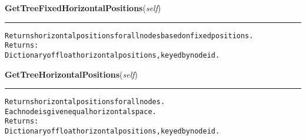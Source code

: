 \hspace{.8\funcindent}\begin{boxedminipage}{\funcwidth}

    \raggedright \textbf{GetTreeFixedHorizontalPositions}(\textit{self})

    \vspace{-1.5ex}

    \rule{\textwidth}{0.5\fboxrule}
\setlength{\parskip}{2ex}
\begin{alltt}

Returns horizontal positions for all nodes based on fixed positions.
Returns:
  Dictionary of float horizontal positions, keyed by node id.
\end{alltt}

\setlength{\parskip}{1ex}
    \end{boxedminipage}

    \label{coinor:grumpy:BB:BBTree:GetTreeHorizontalPositions}

    \vspace{0.5ex}

\hspace{.8\funcindent}\begin{boxedminipage}{\funcwidth}

    \raggedright \textbf{GetTreeHorizontalPositions}(\textit{self})

    \vspace{-1.5ex}

    \rule{\textwidth}{0.5\fboxrule}
\setlength{\parskip}{2ex}
\begin{alltt}

Returns horizontal positions for all nodes.
Each node is given equal horizontal space.
Returns:
  Dictionary of float horizontal positions, keyed by node id.
\end{alltt}

\setlength{\parskip}{1ex}
    \end{boxedminipage}

    \label{coinor:grumpy:BB:BBTree:WriteDataFileFromList}

    \vspace{0.5ex}

